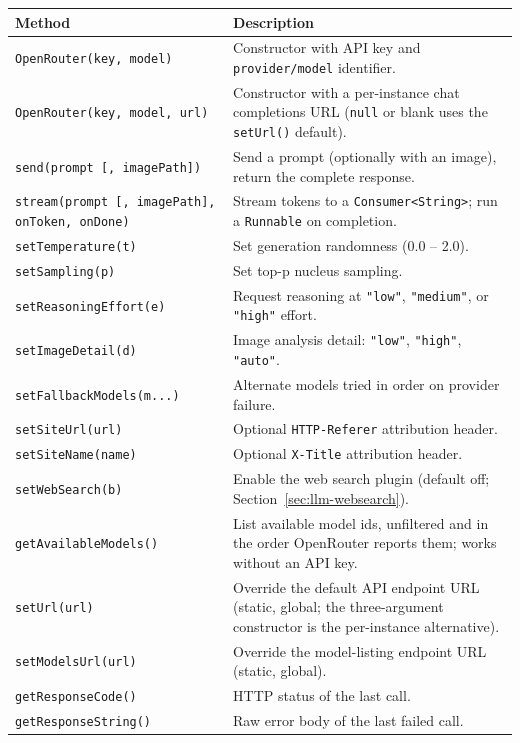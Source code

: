 \begin{longtable}{P{5.4cm}P{5.1cm}}
\toprule
\textbf{Method} & \textbf{Description} \\
\midrule
\endhead
\texttt{OpenRouter(key, model)} & Constructor with API key and \texttt{provider/model} identifier. \\
\texttt{OpenRouter(key, model, url)} & Constructor with a per-instance chat completions URL (\texttt{null} or blank uses the \texttt{setUrl()} default). \\
\texttt{send(prompt [, imagePath])} & Send a prompt (optionally with an image), return the complete response. \\
\texttt{stream(prompt [, imagePath], onToken, onDone)} & Stream tokens to a \texttt{Consumer<String>}; run a \texttt{Runnable} on completion. \\
\texttt{setTemperature(t)} & Set generation randomness (0.0 -- 2.0). \\
\texttt{setSampling(p)} & Set top-p nucleus sampling. \\
\texttt{setReasoningEffort(e)} & Request reasoning at \texttt{"low"}, \texttt{"medium"}, or \texttt{"high"} effort. \\
\texttt{setImageDetail(d)} & Image analysis detail: \texttt{"low"}, \texttt{"high"}, \texttt{"auto"}. \\
\texttt{setFallbackModels(m...)} & Alternate models tried in order on provider failure. \\
\texttt{setSiteUrl(url)} & Optional \texttt{HTTP-Referer} attribution header. \\
\texttt{setSiteName(name)} & Optional \texttt{X-Title} attribution header. \\
\texttt{setWebSearch(b)} & Enable the web search plugin (default off; Section~\ref{sec:llm-websearch}). \\
\texttt{getAvailableModels()} & List available model ids, unfiltered and in the order OpenRouter reports them; works without an API key. \\
\texttt{setUrl(url)} & Override the default API endpoint URL (static, global; the three-argument constructor is the per-instance alternative). \\
\texttt{setModelsUrl(url)} & Override the model-listing endpoint URL (static, global). \\
\texttt{getResponseCode()} & HTTP status of the last call. \\
\texttt{getResponseString()} & Raw error body of the last failed call. \\
\bottomrule
\end{longtable}

